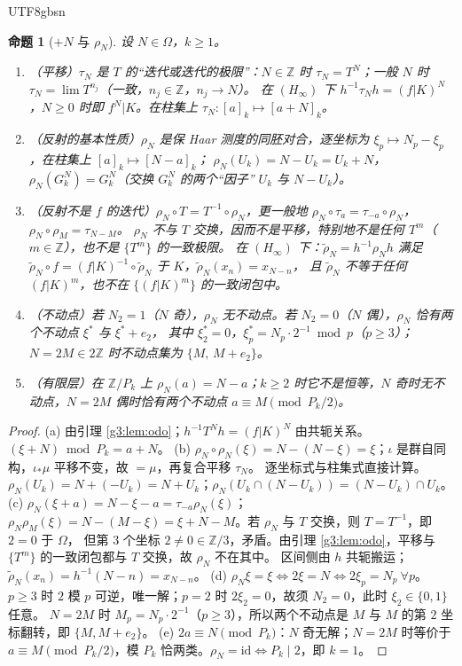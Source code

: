 \documentclass[11pt,a4paper]{article}
\newcommand{\Haar}{\mu}
\newcommand{\status}[1]{\par\noindent\fbox{\textbf{状态：#1}}\par\smallskip}
\newcommand{\Om}{\Omega}               %
\newcommand{\cyl}[2]{[#1]_{#2}}        %
\theoremstyle{plain}
\newtheorem{prop}{命题}
\theoremstyle{definition}
\begin{document}
\begin{CJK}{UTF8}{gbsn}
\begin{prop}[$+N$ 与 $\rho_N$]\label{g3:prop:reflect}
设 $N\in\Om$，$k\ge1$。
\begin{enumerate}[label=(\alph*)]
\item（平移）$\tau_N$ 是 $T$ 的“迭代或迭代的极限”：$N\in\mathbb Z$ 时 $\tau_N=T^N$；一般 $N$ 时 $\tau_N=\lim T^{n_j}$（一致，$n_j\in\mathbb Z$，$n_j\to N$）。
在 $(H_\infty)$ 下 $h^{-1}\tau_Nh=(f|K)^N$，$N\ge0$ 时即 $f^N|K$。在柱集上 $\tau_N:\cyl ak\mapsto\cyl{a+N}k$。
\item（反射的基本性质）$\rho_N$ 是保 Haar 测度的同胚对合，逐坐标为 $\xi_p\mapsto N_p-\xi_p$，在柱集上 $\cyl ak\mapsto\cyl{N-a}k$；
$\rho_N(U_k)=N-U_k=U_k+N$，$\rho_N(G_k^N)=G_k^N$（交换 $G_k^N$ 的两个“因子” $U_k$ 与 $N-U_k$）。
\item（反射不是 $f$ 的迭代）$\rho_N\circ T=T^{-1}\circ\rho_N$，更一般地 $\rho_N\circ\tau_a=\tau_{-a}\circ\rho_N$，$\rho_N\circ\rho_M=\tau_{N-M}$。
$\rho_N$ 不与 $T$ 交换，因而不是平移，特别地不是任何 $T^m$（$m\in\mathbb Z$），也不是 $\{T^m\}$ 的一致极限。
在 $(H_\infty)$ 下：$\tilde\rho_N=h^{-1}\rho_Nh$ 满足 $\tilde\rho_N\circ f=(f|K)^{-1}\circ\tilde\rho_N$ 于 $K$，$\tilde\rho_N(x_n)=x_{N-n}$，
且 $\tilde\rho_N$ 不等于任何 $(f|K)^m$，也不在 $\{(f|K)^m\}$ 的一致闭包中。
\item（不动点）若 $N_2=1$（$N$ 奇），$\rho_N$ 无不动点。若 $N_2=0$（$N$ 偶），$\rho_N$ 恰有两个不动点 $\xi^*$ 与 $\xi^*+e_2$，
其中 $\xi^*_2=0$，$\xi^*_p=N_p\cdot2^{-1}\bmod p$（$p\ge3$）；$N=2M\in2\mathbb Z$ 时不动点集为 $\{M,\,M+e_2\}$。
\item（有限层）在 $\mathbb Z/P_k$ 上 $\rho_N(a)=N-a$；$k\ge2$ 时它不是恒等，$N$ 奇时无不动点，$N=2M$ 偶时恰有两个不动点 $a\equiv M\pmod{P_k/2}$。
\end{enumerate}
\end{prop}
\status{已证}
\begin{proof}
(a) 由引理 \ref{g3:lem:odo}；$h^{-1}T^Nh=(f|K)^N$ 由共轭关系。$(\xi+N)\bmod P_k=a+N$。
(b) $\rho_N\circ\rho_N(\xi)=N-(N-\xi)=\xi$；$\iota$ 是群自同构，$\iota_*\Haar$ 平移不变，故 $=\Haar$，再复合平移 $\tau_N$。
逐坐标式与柱集式直接计算。$\rho_N(U_k)=N+(-U_k)=N+U_k$；$\rho_N(U_k\cap(N-U_k))=(N-U_k)\cap U_k$。
(c) $\rho_N(\xi+a)=N-\xi-a=\tau_{-a}\rho_N(\xi)$；$\rho_N\rho_M(\xi)=N-(M-\xi)=\xi+N-M$。若 $\rho_N$ 与 $T$ 交换，则 $T=T^{-1}$，即 $2=0$ 于 $\Om$，
但第 $3$ 个坐标 $2\ne0\in\mathbb Z/3$，矛盾。由引理 \ref{g3:lem:odo}，平移与 $\{T^m\}$ 的一致闭包都与 $T$ 交换，故 $\rho_N$ 不在其中。
区间侧由 $h$ 共轭搬运；$\tilde\rho_N(x_n)=h^{-1}(N-n)=x_{N-n}$。
(d) $\rho_N\xi=\xi\iff2\xi=N\iff2\xi_p=N_p\ \forall p$。$p\ge3$ 时 $2$ 模 $p$ 可逆，唯一解；$p=2$ 时 $2\xi_2=0$，故须 $N_2=0$，此时 $\xi_2\in\{0,1\}$ 任意。
$N=2M$ 时 $M_p=N_p\cdot2^{-1}$（$p\ge3$），所以两个不动点是 $M$ 与 $M$ 的第 $2$ 坐标翻转，即 $\{M,M+e_2\}$。
(e) $2a\equiv N\pmod{P_k}$：$N$ 奇无解；$N=2M$ 时等价于 $a\equiv M\pmod{P_k/2}$，模 $P_k$ 恰两类。$\rho_N=\mathrm{id}\iff P_k\mid2$，即 $k=1$。
\end{proof}


\end{CJK}
\end{document}
